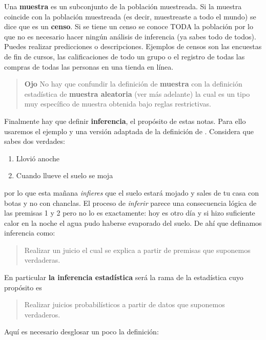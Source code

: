 \documentclass[
]{book}
\begin{document}
Una \textbf{muestra} es un subconjunto de la población muestreada. Si la muestra coincide con la población muestreada (es decir, muestreaste a todo el mundo) se dice que es un \textbf{censo}. Si se tiene un censo se conoce TODA la población por lo que no es necesario hacer ningún análisis de inferencia (ya sabes todo de todos). Puedes realizar predicciones o descripciones. Ejemplos de censos son las encuestas de fin de cursos, las calificaciones de todo un grupo o el registro de todas las compras de todas las personas en una tienda en línea.

\begin{quote}
\textbf{Ojo} No hay que confundir la definición de \textbf{muestra} con la definición estadística de \textbf{muestra aleatoria} (ver más adelante) la cual es un tipo muy específico de muestra obtenida bajo reglas restrictivas.
\end{quote}

Finalmente hay que definir \textbf{inferencia}, el propósito de estas notas. Para ello usaremos el ejemplo y una versión adaptada de la definición de \citet{boghossian2014inference}. Considera que sabes dos verdades:

\begin{enumerate}
\def\labelenumi{\arabic{enumi}.}
\item
  Llovió anoche
\item
  Cuando llueve el suelo se moja
\end{enumerate}

por lo que esta mañana \emph{infieres} que el suelo estará mojado y sales de tu casa con botas y no con chanclas. El proceso de \emph{inferir} parece una consecuencia lógica de las premisas 1 y 2 pero no lo es exactamente: hoy es otro día y si hizo suficiente calor en la noche el agua pudo haberse evaporado del suelo. De ahí que definamos inferencia como:

\begin{quote}
Realizar un juicio el cual se explica a partir de premisas que suponemos verdaderas.
\end{quote}

En particular \textbf{la inferencia estadística} será la rama de la estadística cuyo propósito es

\begin{quote}
Realizar juicios probabilísticos a partir de datos que suponemos verdaderos.
\end{quote}

Aquí es necesario desglosar un poco la definición:
\end{document}
